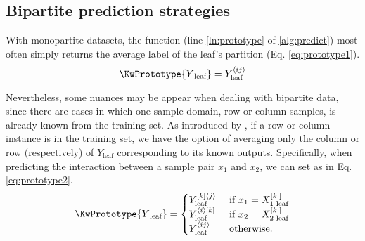 %
%
%


\subsection{Bipartite prediction strategies}

With monopartite datasets, the \KwPrototype function (line \ref{ln:prototype} of \ref{alg:predict}) most often simply returns the average label of the leaf's partition (Eq. \ref{eq:prototype1}).
\begin{equation}
    \KwPrototype{Y\textsubscript{leaf}}=Y_\text{leaf}\mel{ij}
    \label{eq:prototype1}
\end{equation}

Nevertheless, some nuances may be appear when dealing with bipartite data, since there are cases in which one sample domain, row or column samples, is already known from the training set. As introduced by \cite{Pliakos_2018}, if a row or column instance is in the training set, we have the option of averaging only the column or row (respectively) of $Y_\text{leaf}$ corresponding to its known outputs. Specifically, when predicting the interaction between a sample pair $x_1$ and $x_2$, we can set \KwPrototype as in Eq. \ref{eq:prototype2}.
\begin{equation}
    \KwPrototype{Y\textsubscript{leaf}} =
    \begin{cases}
        Y_\text{leaf}^{[k]\angled{j}} & \text{ if } x_1 = X_{1\text{ leaf}}\el{k\cdot}\\
        Y_\text{leaf}^{\angled{i}[k]} & \text{ if } x_2 = X_{2\text{ leaf}}\el{k\cdot}\\
        Y_\text{leaf}\mel{ij} & \text{ otherwise.}
    \end{cases}
    \label{eq:prototype2}
\end{equation}

